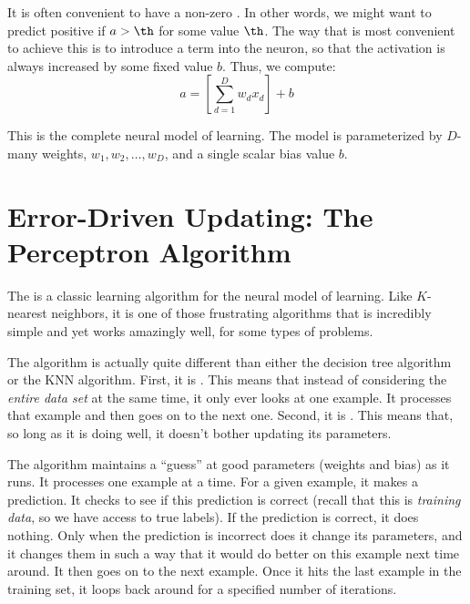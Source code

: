 
It is often convenient to have a non-zero .  In
other words, we might want to predict positive if $a > \th$ for some
value $\th$.  The way that is most convenient to achieve this is to
introduce a  term into the neuron, so that the
activation is always increased by some fixed value $b$.  Thus, we
compute:
\begin{equation} \label{eq:perc:sumbias}
a = \left[ \sum_{d=1}^D w_d x_d \right] + b
\end{equation}

This is the complete neural model of learning.  The model is
parameterized by $D$-many weights, $w_1, w_2, \dots, w_D$, and a
single scalar bias value $b$.

\section{Error-Driven Updating: The Perceptron Algorithm}

The  is a classic learning algorithm for the
neural model of learning.  Like $K$-nearest neighbors, it is one of
those frustrating algorithms that is incredibly simple and yet works
amazingly well, for some types of problems.

The algorithm is actually quite different than either the decision
tree algorithm or the KNN algorithm.  First, it is .
This means that instead of considering the \emph{entire data set} at
the same time, it only ever looks at one example.  It processes that
example and then goes on to the next one.  Second, it is
.  This means that, so long as it is doing well,
it doesn't bother updating its parameters.

The algorithm maintains a ``guess'' at good parameters (weights and
bias) as it runs.  It processes one example at a time.  For a given
example, it makes a prediction.  It checks to see if this prediction
is correct (recall that this is \emph{training data}, so we have
access to true labels).  If the prediction is correct, it does
nothing.  Only when the prediction is incorrect does it change its
parameters, and it changes them in such a way that it would do better
on this example next time around.  It then goes on to the next
example.  Once it hits the last example in the training set, it loops
back around for a specified number of iterations.

